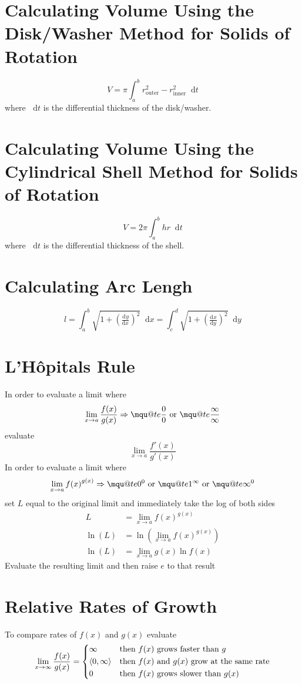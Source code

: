\documentclass[12pt]{article}
\makeatletter
\renewcommand*{\implies}{\Rightarrow}
\newcommand*{\dd}[3][]{\tfrac{\mathrm{d}^{#1}#2}{\mathrm{d}#3^{#1}}}
\newcommand*{\D}[1]{\mathop{}\!\mathrm{d} #1}
\newcommand{\mquote}[1]{{\mathpalette\mqu@te{#1}}}
\newcommand{\mqu@te}[2]{%
  \sbox0{\(\m@th#1\text{``}\)}%
  \sbox1{\(\m@th#1\text{''}\)}%
  \sbox2{\(\m@th#1#2\)}%
  \ifdim\ht2>\ht0
    \raisebox{\dimexpr\ht2-\height}{\box0}%
    #2%
    \raisebox{\dimexpr\ht2-\height}{\box1}%
  \else
    \box0 #2\box1
  \fi
}
\makeatother
\begin{document}
\section*{Calculating Volume Using the Disk\slash Washer Method for Solids of
Rotation}
\[
  V = \pi\int_a^b r_{\text{outer}}^2 - r_{\text{inner}}^2 \D{t}
\]
where \(\D{t}\) is the differential thickness of the disk\slash washer.
\section*{Calculating Volume Using the Cylindrical Shell Method for Solids of
Rotation}
\[
  V = 2\pi \int_a^b hr \D{t}
\]
where \(\D{t}\) is the differential thickness of the shell.
\section*{Calculating Arc Lengh}
\[
  l = \int_a^b \sqrt{1+{\left(\dd{y}{x}\right)}^2} \D{x}
  = \int_c^d \sqrt{1+{\left(\dd{x}{y}\right)}^2} \D{y}
\]
\section*{L'H\^{o}pitals Rule}
In order to evaluate a limit where
\[
  \lim_{x \to a} \frac{f(x)}{g(x)} \implies \mquote{\frac{0}{0}} \text{ or }
  \mquote{\frac{\infty}{\infty}}
\]
evaluate
\[
  \lim_{x \to a} \frac{f'(x)}{g'(x)}
\]
In order to evaluate a limit where
\[
  \lim_{x \to a} {f(x)}^{g(x)} \implies \mquote{0^0} \text{ or }
  \mquote{1^\infty} \text{ or } \mquote{\infty^0}
\]
set \(L\) equal to the original limit and immediately take the log of both
sides
\begin{align*}
  L &= \lim_{x \to a} {f(x)}^{g(x)}\\
  \ln(L) &= \ln\left(\lim_{x \to a} {f(x)}^{g(x)}\right)\\
  \ln(L) &= \lim_{x \to a} g(x) \ln f(x)
\end{align*}
Evaluate the resulting limit and then raise \(e\) to that result
\section*{Relative Rates of Growth}
To compare rates of \(f(x)\) and \(g(x)\) evaluate
\[
  \lim_{x \to \infty} \frac{f(x)}{g(x)} =
  \begin{dcases*}
    \infty & then \(f(x)\) grows faster than \(g\)\\
    \left<0, \infty\right> & then \(f(x)\) and \(g(x)\) grow at the same rate\\
    0 & then \(f(x)\) grows slower than \(g(x)\)
  \end{dcases*}
\]
\end{document}
